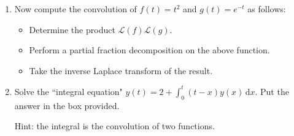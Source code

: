 \documentclass{ximera}
\begin{document}
\begin{enumerate}
\vfill

 $\displaystyle \mathcal{L}[f]\mathcal{L}[g]=$ ...  \hfill  $=\mathcal{L}[...$\hspace{3cm} $]$.


\vfill


\item Now compute the convolution of $f(t)=t^2$ and $g(t)=e^{-t}$ as follows:

\begin{itemize}
\item Determine the product $\mathcal{L}(f)\mathcal{L}(g)$.

\item Perform a partial fraction decomposition on the above function.

\item Take the inverse Laplace transform of the result.

\end{itemize}

\vfill
\vfill

\item Solve the ``integral equation" $y(t)=2+\displaystyle \int_0^t (t-x)y(x)\,\mathrm{d}x$.  Put the answer in the box provided.

\hfill{}\fbox{ \begin{minipage}{4in}\vspace{0.3in} \hfill\vspace{0.3in} \end{minipage} }


Hint: the integral is the convolution of two functions.

\vfill
\vfill


\end{enumerate}
\end{document}

